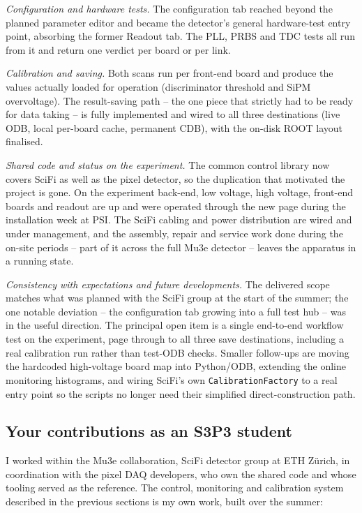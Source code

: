 \documentclass[12pt,a4paper]{article}
\newcommand{\hostgroup}{Mu3e collaboration, SciFi detector group}
\newcommand{\pill}[1]{\textit{#1}\;}   %
\begin{document}
\pill{Configuration and hardware tests.}
The configuration tab reached beyond the planned parameter editor and became the
detector's general hardware-test entry point, absorbing the former Readout tab.
The PLL, PRBS and TDC tests all run from it and return one verdict per board or
per link.

\pill{Calibration and saving.}
Both scans run per front-end board and produce the values actually loaded for
operation (discriminator threshold and SiPM overvoltage). The result-saving path
-- the one piece that strictly had to be ready for data taking -- is fully
implemented and wired to all three destinations (live ODB, local per-board cache,
permanent CDB), with the on-disk ROOT layout finalised.

\pill{Shared code and status on the experiment.}
The common control library now covers SciFi as well as the pixel detector, so the
duplication that motivated the project is gone. On the experiment back-end, low
voltage, high voltage, front-end boards and readout are up and were operated
through the new page during the installation week at PSI. The SciFi cabling and
power distribution are wired and under management, and the assembly, repair and
service work done during the on-site periods -- part of it across the full Mu3e
detector -- leaves the apparatus in a running state.

\pill{Consistency with expectations and future developments.}
The delivered scope matches what was planned with the SciFi group at the start of
the summer; the one notable deviation -- the configuration tab growing into a
full test hub -- was in the useful direction. The principal open item is a single
end-to-end workflow test on the experiment, page through to all three save
destinations, including a real calibration run rather than test-ODB checks.
Smaller follow-ups are moving the hardcoded high-voltage board map into
Python/ODB, extending the online monitoring histograms, and wiring SciFi's own
\texttt{CalibrationFactory} to a real entry point so the scripts no longer need
their simplified direct-construction path.

\subsection{Your contributions as an S3P3 student}

I worked within the \hostgroup{} at ETH Z\"urich, in coordination with the pixel
DAQ developers, who own the shared code and whose tooling served as the
reference. The control, monitoring and calibration system described in the
previous sections is my own work, built over the summer:
\end{document}
